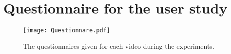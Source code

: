 \chapter{Questionnaire for the user study}
\begin{figure}[hbt!]
    \centering
    \texttt{[image: Questionnare.pdf]}
    \caption{The questionnaires given for each video during the experiments.}
    \label{fig:Questionnare}
\end{figure}
%
